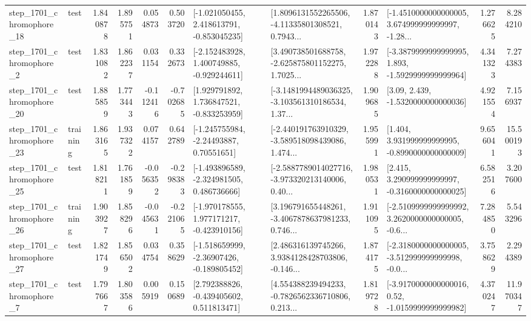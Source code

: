 \begin{tabular}{llrrrrllrlrr}
 step\_1701\_chromophore\_18 &      test &      1.840878 &    1.895751 &      0.054873 &  0.503720 &   [-1.021050455, 2.418613791, -0.853045235] &  [1.8096131552265506, -4.11335801308521, 0.7943... &       1.870143 &  [-1.4510000000000005, 3.674999999999997, -1.28... &            1.276625 &          8.284210 \\
  step\_1701\_chromophore\_2 &      test &      1.831082 &    1.862237 &      0.031154 &  0.332673 &   [-2.152483928, 1.400749885, -0.929244611] &  [3.490738501688758, -2.625875801152275, 1.7025... &       1.972288 &  [-3.3879999999999995, 1.893, -1.5929999999999964] &            4.341323 &          7.274383 \\
 step\_1701\_chromophore\_20 &      test &      1.885859 &    1.773443 &     -0.112416 & -0.702685 &    [1.929791892, 1.736847521, -0.833253959] &  [-3.1481994489036325, -3.103561310186534, 1.37... &       1.909685 &                 [3.09, 2.439, -1.5320000000000036] &            4.921554 &          7.156937 \\
 step\_1701\_chromophore\_23 &  training &      1.863165 &    1.937322 &      0.074157 &  0.642789 &     [-1.245755984, -2.24493887, 0.70551651] &  [-2.440191763910329, -3.589518098439086, 1.474... &       1.955991 &    [1.404, 3.931999999999995, -0.8990000000000009] &            9.656041 &         15.500193 \\
 step\_1701\_chromophore\_25 &      test &      1.818211 &    1.761859 &     -0.056352 & -0.298383 &   [-1.493896589, -2.324981505, 0.486736666] &  [-2.5887789014027716, -3.973320213140006, 0.40... &       1.980531 &    [2.415, 3.290999999999997, -0.3160000000000025] &            6.582516 &          3.207600 \\
 step\_1701\_chromophore\_26 &  training &      1.903927 &    1.858296 &     -0.045631 & -0.221065 &   [-1.970178555, 1.977171217, -0.423910156] &  [3.196791655448261, -3.4067878637981233, 0.746... &       1.911095 &  [-2.5109999999999992, 3.2620000000000005, -0.6... &            7.284850 &          5.543296 \\
 step\_1701\_chromophore\_27 &      test &      1.821749 &    1.856502 &      0.034754 &  0.358629 &   [-1.518659999, -2.36907426, -0.189805452] &  [2.486316139745266, 3.9384128428703806, -0.146... &       1.874175 &  [-2.3180000000000005, -3.512999999999998, -0.0... &            3.758629 &          2.294389 \\
  step\_1701\_chromophore\_7 &      test &      1.797667 &    1.803586 &      0.005919 &  0.150689 &    [2.792388826, -0.439405602, 0.511813471] &  [4.554388239494233, -0.7826562336710806, 0.213... &       1.819728 &   [-3.9170000000000016, 0.52, -1.0159999999999982] &            4.370247 &         11.970347 \\

\end{tabular}

